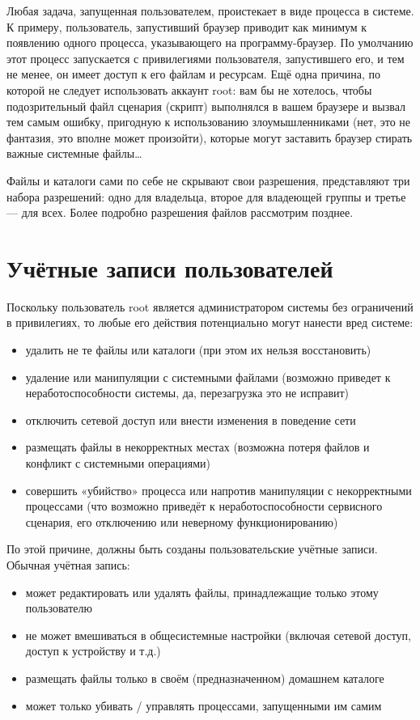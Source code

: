 \documentclass[10pt]{book}
\begin{document}
Любая задача, запущенная пользователем, проистекает в виде процесса  в системе. К примеру,  пользователь, запустивший браузер приводит как минимум к появлению одного процесса, указывающего на программу-браузер. По умолчанию этот процесс запускается с привилегиями пользователя, запустившего его, и тем не менее, он имеет доступ к его файлам и ресурсам. Ещё одна причина, по которой не следует использовать аккаунт root: вам бы не хотелось, чтобы подозрительный файл сценария (скрипт) выполнялся в вашем браузере и вызвал тем самым ошибку, пригодную к использованию злоумышленниками (нет, это не фантазия, это вполне может произойти), которые могут заставить браузер стирать важные системные файлы\ldots

Файлы и каталоги сами по себе не скрывают свои разрешения, представляют три набора разрешений: одно для владельца, второе для владеющей группы и третье — для всех. Более подробно разрешения файлов рассмотрим позднее.

\section{Учётные записи пользователей}

Поскольку пользователь root является администратором системы без ограничений в привилегиях, то любые его действия потенциально могут нанести вред системе:

\begin{itemize}
	\item удалить не те файлы или каталоги (при этом их нельзя восстановить)
	\item удаление или манипуляции с системными файлами (возможно приведет к неработоспособности системы, да, перезагрузка это не исправит)
	\item отключить сетевой доступ или внести изменения в поведение сети
	\item размещать файлы в некорректных местах (возможна потеря файлов и конфликт с системными операциями)
	\item совершить «убийство» процесса или напротив манипуляции с некорректными процессами (что возможно приведёт к неработоспособности сервисного сценария, его отключению или неверному функционированию)
\end{itemize}

По этой причине, должны быть созданы пользовательские учётные записи. Обычная учётная запись:

\begin{itemize}
	\item может редактировать или удалять файлы, принадлежащие только этому пользователю
	\item не может вмешиваться в общесистемные настройки (включая сетевой доступ, доступ к устройству и т.д.)
	\item размещать файлы только в своём (предназначенном) домашнем каталоге
	\item может только убивать / управлять процессами, запущенными им самим
\end{itemize}
\end{document}
